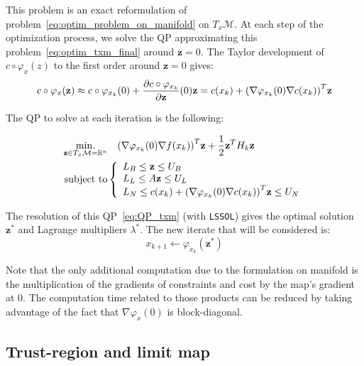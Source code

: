 This problem is an exact reformulation of problem~\ref{eq:optim_problem_on_manifold} on $T_x\mathcal{M}$.
At each step of the optimization process, we solve the QP approximating this problem~\ref{eq:optim_txm_final} around $\mathbf{z}=0$.
The Taylor development of $c\circ\varphi_x(z)$ to the first order around $\mathbf{z} = 0$ gives:
\begin{equation}
  c \circ \varphi_x(\mathbf{z}) \approx c\circ \varphi_{x_k}(0) + \frac{\partial c\circ \varphi_{x_k}}{\partial {\bf z}}(0) {\bf z } = c(x_k) + {\left(\nabla\varphi_{x_k}(0) \nabla c (x_k)\right)}^T\mathbf{z}
\end{equation}

The QP to solve at each iteration is the following:

\begin{align}
  \label{eq:QP_txm}
  \begin{split}
  \operatorname*{min.}_{\mathbf{z} \in T_x\mathcal{M}=\mathbb{R}^n } & \quad {\left(\nabla\varphi_{x_k}(0) \nabla f (x_k)\right)}^T\mathbf{z} + \frac{1}{2} {\bf z }^T H_k{\bf z }\\
  \text{subject to}&\left\{
  \begin{array}{lr}
    L_B \leq \mathbf{z} \leq U_B \\
    L_L \leq A \mathbf{z} \leq U_L \\
    L_N \leq c(x_k) + {\left(\nabla\varphi_{x_k}(0) \nabla c (x_k)\right)}^T\mathbf{z}\leq U_N\\
  \end{array}\right.
  \end{split}
\end{align}

The resolution of this QP~\ref{eq:QP_txm} (with {\tt LSSOL}) gives the optimal solution $\mathbf{z}^*$ and Lagrange multipliers $\lambda^*$.
The new iterate that will be considered is:
\begin{equation}
  x_{k+1}\leftarrow \varphi_{x_k}(\mathbf{z}^*)
\end{equation}

Note that the only additional computation due to the formulation on manifold is the multiplication of the gradients of constraints and cost by the map's gradient at $0$.
The computation time related to those products can be reduced by taking advantage of the fact that $\nabla \varphi_x(0)$ is block-diagonal.

\subsection{Trust-region and limit map}
\label{sub:trust_region_and_limit_map}

